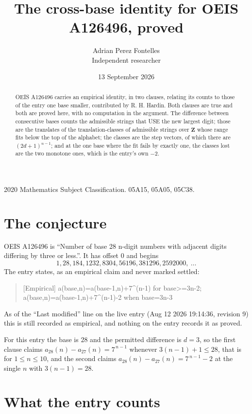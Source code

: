 \documentclass[11pt,a4paper]{article}
\title{The cross-base identity for OEIS A126496, proved}
\author{Adrian Perez Fontelles\\ \small Independent researcher}
\date{13 September 2026}
\theoremstyle{plain}
\theoremstyle{definition}
\begin{document}
\maketitle

\begin{abstract}
OEIS A126496 carries an empirical identity, in two clauses, relating its counts to those of the
entry one base smaller, contributed by R. H. Hardin. Both clauses are true and both are proved
here, with no computation in the argument. The difference between consecutive bases counts the
admissible strings that USE the new largest digit; those are the translates of the
translation-classes of admissible strings over $\mathbf{Z}$ whose range fits below the top of
the alphabet; the classes are the step vectors, of which there are $(2d+1)^{n-1}$; and at the
one base where the fit fails by exactly one, the classes lost are the two monotone ones, which
is the entry's own $-2$.
\end{abstract}

\noindent\small 2020 Mathematics Subject Classification. 05A15, 05A05, 05C38.\normalsize

\section{The conjecture}

OEIS A126496 is ``Number of base 28 n-digit numbers with adjacent digits differing by three or less.''. It has offset $0$ and begins
\[
1, 28, 184, 1232, 8304, 56196, 381296, 2592000,\ \dots
\]
The entry states, as an empirical claim and never marked settled:
\begin{quote}
[Empirical] a(base,n)=a(base-1,n)+7\textasciicircum{}(n-1) for base>=3n-2; a(base,n)=a(base-1,n)+7\textasciicircum{}(n-1)-2 when base=3n-3
\end{quote}
As of the ``Last modified'' line on the live entry (Aug 12 2026 19:14:36, revision 9)
this is still recorded as empirical, and nothing on the entry records it as proved.

For this entry the base is $28$ and the permitted difference is $d=3$, so the first clause
claims $a_{28}(n)-a_{27}(n)=7^{\,n-1}$ whenever $3(n-1)+1\le28$, that is for
$1\le n\le10$, and the second claims $a_{28}(n)-a_{27}(n)=7^{\,n-1}-2$ at the single
$n$ with $3(n-1)=28$.

\section{What the entry counts}
\end{document}
